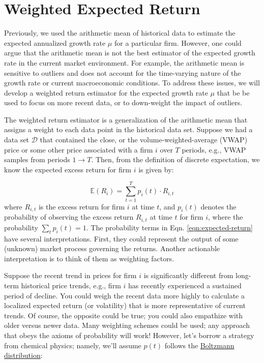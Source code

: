 \documentclass[11pt]{article}
\theoremstyle{definition}
\begin{document}
\section*{Weighted Expected Return}
Previously, we used the arithmetic mean of historical data to estimate the expected annualized growth rate $\mu$ for a particular firm.
However, one could argue that the arithmetic mean is not the best estimator of the expected growth rate in the current market environment.
For example, the arithmetic mean is sensitive to outliers and does not account for the time-varying nature of the growth rate 
or current macroeconomic conditions. To address these issues, we will develop a weighted return estimator for the expected growth rate $\mu$
that be be used to focus on more recent data, or to down-weight the impact of outliers. 

The weighted return estimator is a generalization of the arithmetic mean that assigns a weight to each data point in the historical data set.
Suppose we had a data set $\mathcal{D}$ that contained the close, or the volume-weighted-average (VWAP) price 
or some other price associated with a firm $i$ over $T$ periods, e.g., VWAP samples from periods $1\rightarrow{T}$.
Then, from the definition of discrete expectation, we know the expected excess return for firm $i$ is given by:

\begin{equation}\label{eqn:expected-return}
\mathbb{E}\left(R_{i}\right) = \sum_{t=1}^{T}p_{i}(t)\cdot{R_{i,t}}
\end{equation}
where $R_{i,t}$ is the excess return for firm $i$ at time $t$, 
and $p_{i}(t)$ denotes the probability of observing the excess return $R_{i,t}$ at time $t$ for firm $i$, 
where the probability $\sum_{t}p_{i}(t) = 1$. 
The probability terms in Eqn. \eqref{eqn:expected-return} have several interpretations. 
First, they could represent the output of some (unknown) market process governing the returns. 
Another actionable interpretation is to think of them as weighting factors. 

Suppose the recent trend in prices for firm $i$ is significantly different from long-term historical price trends, 
e.g., firm $i$ has recently experienced a sustained period of decline. 
You could weigh the recent data more highly to calculate a localized expected return (or volatility) 
that is more representative of current trends. 
Of course, the opposite could be true; you could also empathize with older versus newer data. Many weighting schemes could be used; any approach that obeys the axioms of probability will work!
However, let's borrow a strategy from chemical physics; namely, we'll assume $p(t)$ follows the 
\href{https://en.wikipedia.org/wiki/Boltzmann_distribution}{Boltzmann distribution}:
\end{document}
